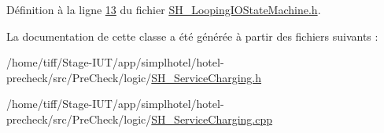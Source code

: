 Définition à la ligne \hyperlink{SH__LoopingIOStateMachine_8h_source_l00013}{13} du fichier \hyperlink{SH__LoopingIOStateMachine_8h_source}{S\-H\-\_\-\-Looping\-I\-O\-State\-Machine.\-h}.



La documentation de cette classe a été générée à partir des fichiers suivants \-:\begin{DoxyCompactItemize}
\item 
/home/tiff/\-Stage-\/\-I\-U\-T/app/simplhotel/hotel-\/precheck/src/\-Pre\-Check/logic/\hyperlink{SH__ServiceCharging_8h}{S\-H\-\_\-\-Service\-Charging.\-h}\item 
/home/tiff/\-Stage-\/\-I\-U\-T/app/simplhotel/hotel-\/precheck/src/\-Pre\-Check/logic/\hyperlink{SH__ServiceCharging_8cpp}{S\-H\-\_\-\-Service\-Charging.\-cpp}\end{DoxyCompactItemize}
